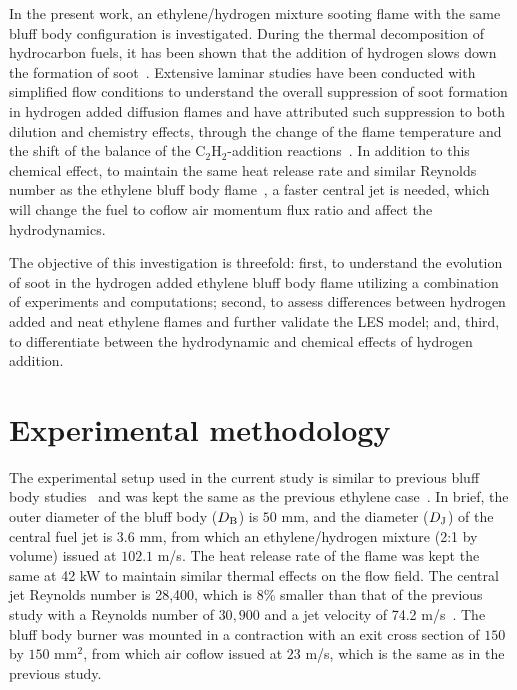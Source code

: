 \documentclass[review,3p,times]{elsarticle}
\begin{document}
In the present work, an ethylene/hydrogen mixture sooting flame with the same bluff body configuration is investigated.  During the thermal decomposition of hydrocarbon fuels, it has been shown that the addition of hydrogen slows down the formation of soot~\cite{tesner58}.  Extensive laminar studies have been conducted with simplified flow conditions to understand the overall suppression of soot formation in hydrogen added diffusion flames and have attributed such suppression to both dilution and chemistry effects\textcolor{Rv1}{, through the change of the flame temperature and the shift of the balance of the C$_2$H$_2$-addition reactions}~\cite{dearden68,du95,gulder96,guo06,zhao14}.  In addition to this chemical effect, to maintain the same \textcolor{Rv1}{heat release rate and similar }Reynolds number as the ethylene bluff body flame~\cite{mueller13}, a faster central jet is needed, which will change the fuel to coflow air momentum flux ratio and affect the hydrodynamics.

The objective of this investigation is threefold: first, to understand the evolution of soot in the hydrogen added ethylene bluff body flame utilizing a combination of experiments and computations; second, to assess differences between hydrogen added and neat ethylene flames and further validate the LES model; and, third, to differentiate between the hydrodynamic and chemical effects of hydrogen addition.



\section{Experimental methodology}

The experimental setup used in the current study is similar to previous bluff body studies~\cite{dally96,dally98a} and was kept the same as the previous ethylene case~\cite{mueller13}.  In brief, the outer diameter of the bluff body ($D_{\rm B}$) is $50$ mm, and the diameter ($D_{\rm J}$) of the central fuel jet is $3.6$ mm, from which an ethylene/hydrogen mixture (2:1 by volume) issued at $102.1$ m/s.  \textcolor{Rv1}{The heat release rate of the flame was kept the same at 42 kW to maintain similar thermal effects on the flow field.  The central jet Reynolds number is 28,400, which is 8\% smaller than that of the previous study with a Reynolds number of $30,900$ and a jet velocity of 74.2 m/s~\cite{mueller13}.}  The bluff body burner was mounted in a contraction with an exit cross section of $150$ by $150$ mm$^2$, from which air coflow issued at $23$ m/s\textcolor{Rv1}{, which is the same as in the previous study.}
\end{document}
